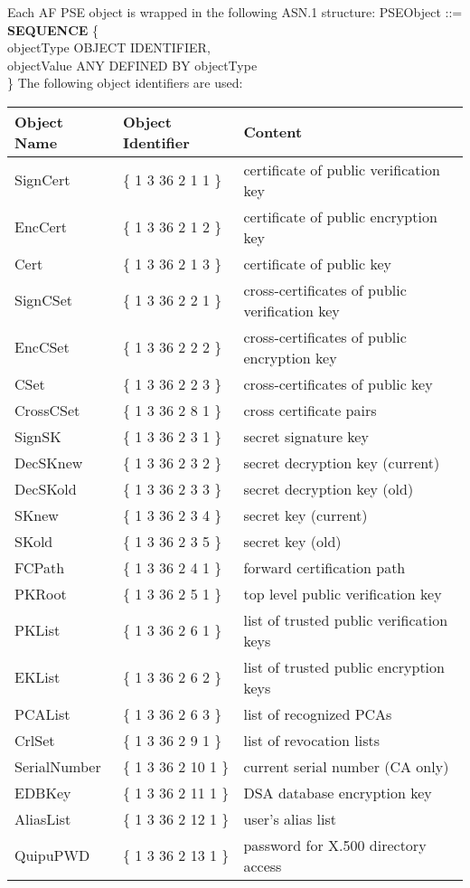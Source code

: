Each AF PSE object is wrapped in the following ASN.1 structure:
{\small
\bvtab
\2 PSEObject ::= \3 {\bf SEQUENCE} \{ \\
\7 objectType \3 OBJECT IDENTIFIER, \\
\7 objectValue \3 ANY DEFINED BY objectType \\
\5 \}
\evtab
}
The following object identifiers are used:
\bc
\begin{tabular}{|l|l|l|} \hline
{\bf Object Name} & {\bf Object Identifier} & {\bf Content} \\ \hline
SignCert       & \{ 1 3 36 2 1 1 \} & certificate of public verification key      \\
EncCert        & \{ 1 3 36 2 1 2 \} & certificate of public encryption key        \\
Cert           & \{ 1 3 36 2 1 3 \} & certificate of public key                    \\
SignCSet       & \{ 1 3 36 2 2 1 \} & cross-certificates of public verification key \\
EncCSet        & \{ 1 3 36 2 2 2 \} & cross-certificates of public encryption key   \\
CSet           & \{ 1 3 36 2 2 3 \} & cross-certificates of public key            \\
CrossCSet      & \{ 1 3 36 2 8 1 \} & cross certificate pairs		     \\
SignSK         & \{ 1 3 36 2 3 1 \} & secret signature key                        \\
DecSKnew       & \{ 1 3 36 2 3 2 \} & secret decryption key (current)             \\
DecSKold       & \{ 1 3 36 2 3 3 \} & secret decryption key (old)                 \\
SKnew          & \{ 1 3 36 2 3 4 \} & secret key (current)                        \\
SKold          & \{ 1 3 36 2 3 5 \} & secret key (old)                            \\
FCPath         & \{ 1 3 36 2 4 1 \} & forward certification path                  \\
PKRoot         & \{ 1 3 36 2 5 1 \} & top level public verification key           \\
PKList         & \{ 1 3 36 2 6 1 \} & list of trusted public verification keys    \\
EKList         & \{ 1 3 36 2 6 2 \} & list of trusted public encryption keys      \\
PCAList        & \{ 1 3 36 2 6 3 \} & list of recognized PCAs      \\
CrlSet         & \{ 1 3 36 2 9 1 \} & list of revocation lists         \\
SerialNumber   & \{ 1 3 36 2 10 1 \} & current serial number (CA only)         \\
EDBKey         & \{ 1 3 36 2 11 1 \} & DSA database encryption key        \\
AliasList      & \{ 1 3 36 2 12 1 \} & user's alias list         \\
QuipuPWD       & \{ 1 3 36 2 13 1 \} & password for X.500 directory access         \\ \hline
\end{tabular}

